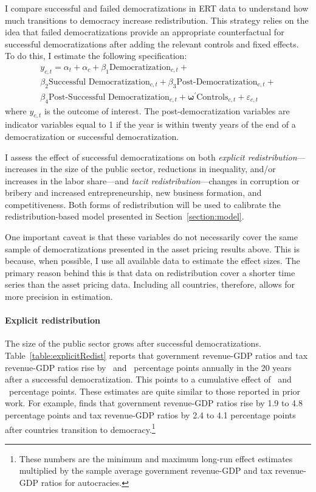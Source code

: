 \documentclass[12pt]{article}
\numberwithin{equation}{section}
\begin{document}
I compare successful and failed democratizations in ERT data to understand how much transitions to democracy increase redistribution. This strategy relies on the idea that failed democratizations provide an appropriate counterfactual for successful democratizations after adding the relevant controls and fixed effects. To do this, I estimate the following specification:
\begin{multline}
y_{c,t} = \alpha_{t} + \alpha_{c} + \beta_{1} \textrm{Democratization}_{c,t} + \\ \beta_{2} \textrm{Successful Democratization}_{c,t}  +  \beta_{3} \textrm{Post-Democratization}_{c,t} +  \\ \beta_{4} \textrm{Post-Successful Democratization}_{c,t} +  \mathbf{\omega}^\prime \textrm{Controls}_{c,t} + \varepsilon_{c,t} \label{eq:reg_redistribute}
\end{multline}
where $y_{c,t}$ is the outcome of interest. The post-democratization variables are indicator variables equal to 1 if the year is within twenty years of the end of a democratization or successful democratization. 

I assess the effect of successful democratizations on both \textit{explicit redistribution}---increases in the size of the public sector, reductions in inequality, and/or increases in the labor share---and \textit{tacit redistribution}---changes in corruption or bribery and increased entrepreneurship, new business formation, and competitiveness.  Both forms of redistribution will be used to calibrate the redistribution-based model presented in Section~\ref{section:model}. 

One important caveat is that these variables do not necessarily cover the same sample of democratizations presented in the asset pricing results above. This is because, when possible, I use all available data to estimate the effect sizes. The primary reason behind this is that data on redistribution cover a shorter time series than the asset pricing data. Including all countries, therefore, allows for more precision in estimation.

\paragraph{Explicit redistribution}
The size of the public sector grows after successful democratizations. Table~\ref{table:explicitRedist} reports that government revenue-GDP ratios and tax revenue-GDP ratios rise by \tabEightcolOnePE\ and \tabEightcolTwoPE\ percentage points annually in the 20 years after a successful democratization. This points to a cumulative effect of \tabEightOneCE\ and \tabEightTwoCE\ percentage points. These estimates are quite similar to those reported in prior work. For example, \cite{Acemoglu2015} finds that government revenue-GDP ratios rise by 1.9 to 4.8 percentage points  and tax revenue-GDP ratios by 2.4 to 4.1 percentage points after countries transition to democracy.\footnote{These numbers are the minimum and maximum long-run effect estimates multiplied by the sample average government revenue-GDP and tax revenue-GDP ratios for autocracies.}
\end{document}
